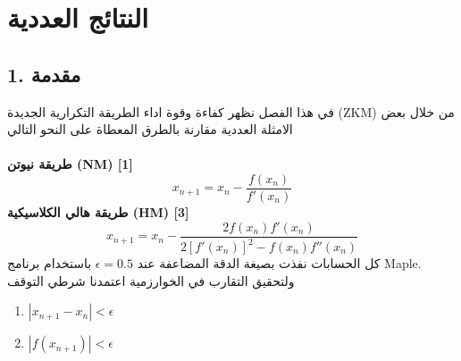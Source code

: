 \chapter{النتائج العددية}

\section*{1. مقدمة}
في هذا الفصل نظهر كفاءة وقوة اداء الطريقة التكرارية الجديدة (ZKM) من خلال بعض الامثلة العددية مقارنة بالطرق المعطاة على النحو التالي\\ \\
\textbf{طريقة نيوتن (NM) [1]}
\[
x_{n+1} = x_n - \frac{f(x_n)}{f'(x_n)}
\]
\textbf{طريقة هالي الكلاسيكية (HM) [3]}
\[
x_{n+1} = x_n - \frac{2f(x_n) f'(x_n)}{2[f'(x_n)]^2 - f(x_n )f''(x_n)}
\]
كل الحسابات نفذت بصيغة الدقة المضاعفة عند $\epsilon = 0.5$ باستخدام برنامج Maple. ولتحقيق التقارب في الخوارزمية اعتمدنا شرطي التوقف
\begin{enumerate}
	\item $|x_{n+1}-x_n|<\epsilon$
	\item $|f(x_{n+1})|<\epsilon$
\end{enumerate}
\newpage

		\renewcommand{\arraystretch}{2}

